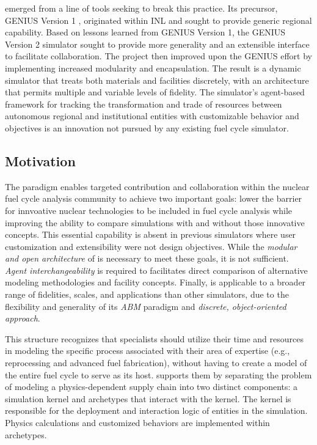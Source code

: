 \Cyclus emerged from a line of tools seeking to break this practice.  Its
precursor,
\gls{GENIUS} Version 1 \cite{dunzik-gougar_global_2007,jain_transitioning_2006},
originated within \gls{INL} and sought to provide generic regional capability.
Based on lessons learned from \gls{GENIUS} Version 1, the \gls{GENIUS} Version
2 \cite{oliver_studying_2009,huff_geniusv2_2009} simulator sought to provide more
generality and an extensible interface to facilitate collaboration.  The
\Cyclus project then improved upon the \gls{GENIUS} effort by
implementing increased modularity and encapsulation.  The result is a dynamic
simulator that treats both materials and facilities discretely, with an
architecture that permits multiple and variable levels of fidelity. The
simulator's agent-based framework for tracking the transformation and trade of
resources between autonomous regional and institutional entities with
customizable behavior and objectives is an innovation not pursued by any
existing fuel cycle simulator.


\subsection{Motivation}

The \Cyclus paradigm enables targeted contribution and collaboration within the
nuclear fuel cycle analysis community to achieve two important goals: lower the
barrier for innvoative nuclear technologies to be included in fuel cycle analysis 
while improving the ability to compare simulations with and without those innovative
concepts.  This essential capability is absent in
previous simulators where user customization and extensibility were not design
objectives.  While the \emph{modular and open architecture} of
\Cyclus is necessary to meet these goals, it is not sufficient.  
\emph{Agent interchangeability} is required to facilitates direct comparison 
of alternative modeling methodologies and facility concepts.  Finally, \Cyclus is
applicable to a broader range of fidelities, scales, and applications than
other simulators, due to the flexibility and generality of its
\emph{\gls{ABM}} paradigm and \emph{discrete, object-oriented approach}.

This structure recognizes that specialists should utilize their time and
resources in modeling the specific process associated with their area of
expertise (e.g., reprocessing and advanced fuel fabrication), without having to
create a model of the entire fuel cycle to serve as its host.  \Cyclus supports
them by separating the problem of modeling a physics-dependent supply chain
into two distinct components: a simulation kernel and archetypes that interact
with the kernel. The kernel is responsible for the deployment and interaction
logic of entities in the simulation.  Physics calculations and customized
behaviors are implemented within archetypes.

